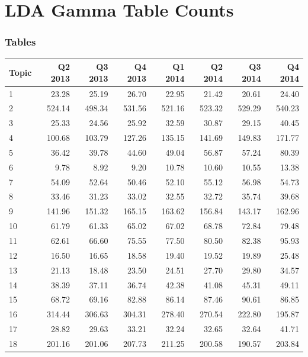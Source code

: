 \chapter{LDA Gamma Table Counts}	
	
	
	\subsection{Tables}

\begin{table}[]
		\small
	\begin{tabular}{l|rrrrrrr}
		Topic & Q2 2013 & Q3 2013 & Q4 2013 & Q1 2014 & Q2 2014 & Q3 2014 & Q4 2014 \\
		\hline
		1 & 23.28 & 25.19 & 26.70 & 22.95 & 21.42 & 20.61 & 24.40 \\
		2 & 524.14 & 498.34 & 531.56 & 521.16 & 523.32 & 529.29 & 540.23 \\
		3 & 25.33 & 24.56 & 25.92 & 32.59 & 30.87 & 29.15 & 40.45 \\
		4 & 100.68 & 103.79 & 127.26 & 135.15 & 141.69 & 149.83 & 171.77 \\
		5 & 36.42 & 39.78 & 44.60 & 49.04 & 56.87 & 57.24 & 80.39 \\
		6 & 9.78 & 8.92 & 9.20 & 10.78 & 10.60 & 10.55 & 13.38 \\
		7 & 54.09 & 52.64 & 50.46 & 52.10 & 55.12 & 56.98 & 54.73 \\
		8 & 33.46 & 31.23 & 33.02 & 32.55 & 32.72 & 35.74 & 39.68 \\
		9 & 141.96 & 151.32 & 165.15 & 163.62 & 156.84 & 143.17 & 162.96 \\
		10 & 61.79 & 61.33 & 65.02 & 67.02 & 68.78 & 72.84 & 79.48 \\
		11 & 62.61 & 66.60 & 75.55 & 77.50 & 80.50 & 82.38 & 95.93 \\
		12 & 16.50 & 16.65 & 18.58 & 19.40 & 19.52 & 19.89 & 25.48 \\
		13 & 21.13 & 18.48 & 23.50 & 24.51 & 27.70 & 29.80 & 34.57 \\
		14 & 38.39 & 37.11 & 36.74 & 42.38 & 41.08 & 45.31 & 49.11 \\
		15 & 68.72 & 69.16 & 82.88 & 86.14 & 87.46 & 90.61 & 86.85 \\
		16 & 314.44 & 306.63 & 304.31 & 278.40 & 270.54 & 222.80 & 195.87 \\
		17 & 28.82 & 29.63 & 33.21 & 32.24 & 32.65 & 32.64 & 41.71 \\
		18 & 201.16 & 201.06 & 207.73 & 211.25 & 200.58 & 190.57 & 203.84 \\

\end{tabular}
\end{table}

